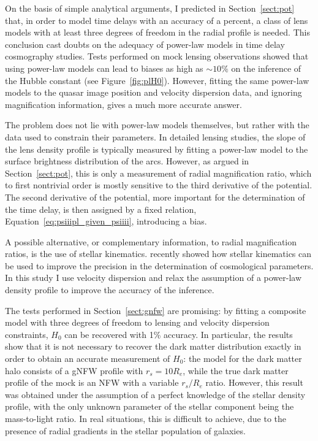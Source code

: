 \documentclass[usenatbib]{mnras}
\def\reff{R_e}
\def\Sref#1{Section~\ref{#1}\xspace}
\def\Fref#1{Figure~\ref{#1}\xspace}
\def\Eref#1{Equation~\ref{#1}\xspace}
\begin{document}
On the basis of simple analytical arguments, I predicted in \Sref{sect:pot} that, in order to model time delays with an accuracy of a percent, a class of lens models with at least three degrees of freedom in the radial profile is needed.
This conclusion cast doubts on the adequacy of power-law models in time delay cosmography studies.
Tests performed on mock lensing observations showed that using power-law models can lead to biases as high as $\sim10\%$ on the inference of the Hubble constant (see \Fref{fig:plH0}).
However, 
fitting the same power-law models to the quasar image position and velocity dispersion data, and ignoring magnification information, gives a much more accurate answer.

The problem does not lie with power-law models themselves, but rather with the data used to constrain their parameters.
In detailed lensing studies, the slope of the lens density profile is typically measured by fitting a power-law model to the surface brightness distribution of the arcs.
However, as argued in \Sref{sect:pot}, this is only a measurement of radial magnification ratio, which to first nontrivial order is mostly sensitive to the third derivative of the potential.
The second derivative of the potential, more important for the determination of the time delay, is then assigned by a fixed relation, \Eref{eq:psiiipl_given_psiiii}, introducing a bias.

A possible alternative, or complementary information, to radial magnification ratios, is the use of stellar kinematics.
\cite{STA17} recently showed how stellar kinematics can be used to improve the precision in the determination of cosmological parameters.
In this study I use velocity dispersion and relax the assumption of a power-law density profile to improve the accuracy of the inference.

The tests performed in \Sref{sect:gnfw} are promising: by fitting a composite model with three degrees of freedom to lensing and velocity dispersion constraints, $H_0$ can be recovered with 1\% accuracy.
In particular, the results show that it is not necessary to recover the dark matter distribution exactly in order to obtain an accurate measurement of $H_0$: the model for the dark matter halo consists of a gNFW profile with $r_s=10\reff$, while the true dark matter profile of the mock is an NFW with a variable $r_s/\reff$ ratio.
However, this result was obtained under the assumption of a perfect knowledge of the stellar density profile, with the only unknown parameter of the stellar component being the mass-to-light ratio.
In real situations, this is difficult to achieve, due to the presence of radial gradients in the stellar population of galaxies.
\end{document}
